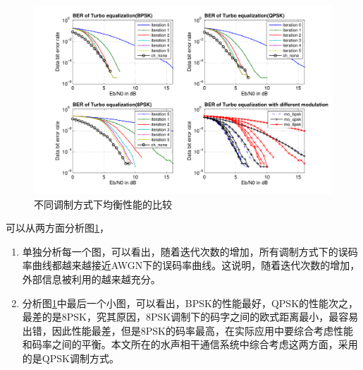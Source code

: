 \begin{figure}[htb]
  \begin{center}
    \includegraphics[width=\textwidth]{images/different_mod_separate.pdf}
  \end{center}
  \caption{不同调制方式下均衡性能的比较}
  \label{fig:3.4}
\end{figure}
可以从两方面分析图\ref{fig:3.4}，
\begin{enumerate}
    \item
        单独分析每一个图，可以看出，随着迭代次数的增加，所有调制方式下的误码率曲线都越来越接近AWGN下的误码率曲线。这说明，随着迭代次数的增加，外部信息被利用的越来越充分。
    \item
        分析图\ref{fig:3.4}中最后一个小图，可以看出，BPSK的性能最好，QPSK的性能次之，最差的是8PSK，究其原因，8PSK调制下的码字之间的欧式距离最小，最容易出错，因此性能最差，但是8PSK的码率最高，在实际应用中要综合考虑性能和码率之间的平衡。本文所在的水声相干通信系统中综合考虑这两方面，采用的是QPSK调制方式。
\end{enumerate}

